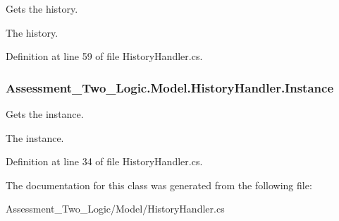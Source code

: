 Gets the history. 

The history.

Definition at line 59 of file HistoryHandler.cs.

\hypertarget{class_assessment___two___logic_1_1_model_1_1_history_handler_a299097380605ceea09d4fb12ee4f9295}{
\subsubsection[{Instance}]{ Assessment\_\-Two\_\-Logic.Model.HistoryHandler.Instance}}
\label{class_assessment___two___logic_1_1_model_1_1_history_handler_a299097380605ceea09d4fb12ee4f9295}


Gets the instance. 

The instance.

Definition at line 34 of file HistoryHandler.cs.



The documentation for this class was generated from the following file:\begin{DoxyCompactItemize}
\item 
Assessment\_\-Two\_\-Logic/Model/HistoryHandler.cs\end{DoxyCompactItemize}
